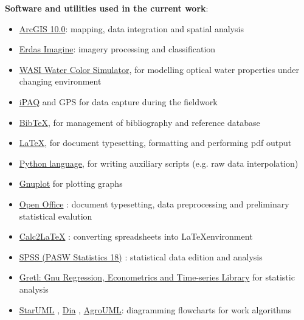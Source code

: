 \documentclass[10pt, a4paper]{article}
\begin{document}
\textbf{Software and utilities used in the current work}:\\
\begin{itemize}
	\item \href{http://www.esri.com/software/arcgis/index.html}{ArcGIS 10.0}: mapping, data integration and spatial analysis
	\item \href{http://www.erdas.com/products/ERDASIMAGINE/ERDASIMAGINE/Details.aspx}{Erdas Imagine}: imagery processing and classification
	\item \href{http://www.filewatcher.com/b/ftp/ftp.dfd.dlr.de/pub/WASI.0.0.html}{WASI Water Color Simulator}, for modelling optical water properties under changing environment
	\item \href{http://welcome.hp.com/country/us/en/prodserv/handheld.html}{iPAQ} and GPS for data capture during the fieldwork
	\item \href{http://www.bibtex.org/de/}{BibTeX}, for management of bibliography and reference database
	\item \href{http://www.latex-project.org/}{\LaTeX}, for document typesetting, formatting and performing pdf output
	\item \href{http://www.python.org/}{Python language}, for writing auxiliary scripts (e.g. raw data interpolation)
	\item \href{http://www.gnuplot.info/}{Gnuplot} for plotting graphs
	\item \href{http://www.openoffice.org/}{Open Office} : document typesetting, data preprocessing and preliminary statistical evalution
	\item \href{http://calc2latex.sourceforge.net/}{Calc2LaTeX} : converting spreadsheets into \LaTeX environment
	\item \href{http://www.spss.com/}{SPSS (PASW Statistics 18)} : statistical data edition and analysis 
	\item \href{http://gretl.sourceforge.net/}{Gretl: Gnu Regression, Econometrics and Time-series Library} for statistic analysis
	\item \href{http://staruml.sourceforge.net/en/}{StarUML} , \href{http://live.gnome.org/Dia}{Dia} , \href{http://argouml.tigris.org/}{AgroUML}: diagramming flowcharts for work algorithms
\end{itemize}
\pagebreak

\section*{}
\listoffigures
\pagebreak
\end{document}

